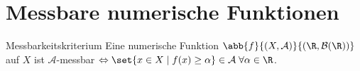 \section*{Messbare numerische Funktionen}

\begin{karte}{Messbarkeitskriterium}
	Eine numerische Funktion \(  \abb{f}{(X, \mathcal{A})}{(\R, \mathcal{B}(\R))}\) auf \(X\) ist 
	\( \mathcal{A} \)-messbar \( \Leftrightarrow \set{x \in X \;|\; f(x) \geq \alpha} \in \mathcal{A} \;\forall \alpha \in \R \).
\end{karte}